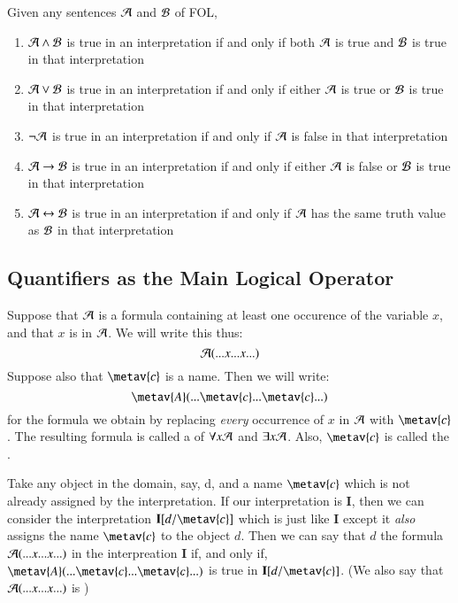 \begin{definition}
    Given any sentences $\mathcal{A}$ and $\mathcal{B}$ of FOL, \begin{enumerate}
        \item $\mathcal{A}\wedge \mathcal{B}$ is true in an interpretation if and only if both $\mathcal{A}$ is true and $\mathcal{B}$ is true in that interpretation
        \item $\mathcal{A}\vee \mathcal{B}$ is true in an interpretation if and only if either $\mathcal{A}$ is true or $\mathcal{B}$ is true in that interpretation
        \item $\neg \mathcal{A}$ is true in an interpretation if and only if $\mathcal{A}$ is false in that interpretation
        \item $\mathcal{A}\rightarrow \mathcal{B}$ is true in an interpretation if and only if either $\mathcal{A}$ is false or $\mathcal{B}$ is true in that interpretation
        \item $\mathcal{A}\leftrightarrow \mathcal{B}$ is true in an interpretation if and only if $\mathcal{A}$ has the same truth value as $\mathcal{B}$ in that interpretation
    \end{enumerate}
\end{definition}


\subsection{ Quantifiers as the Main Logical Operator}

\begin{definition}
    Suppose that $\mathcal{A}$ is a formula containing at least one occurence of the variable $x$, and that $x$ is  in $\mathcal{A}$. We will write this thus:\begin{equation*}
        \mathcal{A}(...x...x...)
    \end{equation*}
    Suppose also that $\metav{c}$ is a name. Then we will write:\begin{equation*}
        \metav{A}(...\metav{c}...\metav{c}...)
    \end{equation*}
    for the formula we obtain by replacing \emph{every} occurrence of $x$ in $\mathcal{A}$ with $\metav{c}$. The resulting formula is called a  of $\forall x\mathcal{A}$ and $\exists x\mathcal{A}$. Also, $\metav{c}$ is called the .
\end{definition}


\begin{definition}
    Take any object in the domain, say, d, and a name $\metav{c}$ which is not already assigned by the interpretation. If our interpretation is $\mathbf{I}$, then we can consider the interpretation $\mathbf{I}[d/\metav{c}]$ which is just like $\mathbf{I}$ except it \emph{also} assigns the name $\metav{c}$ to the object $d$. Then we can say that $d$  the formula $\mathcal{A}(...x...x...)$ in the interpreation $\mathbf{I}$ if, and only if, $\metav{A}(...\metav{c}...\metav{c}...)$ is true in $\mathbf{I}[d/\metav{c}]$. (We also say that $\mathcal{A}(...x...x...)$ is )
\end{definition}


